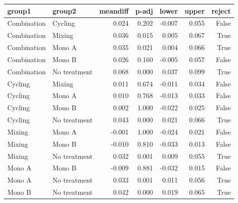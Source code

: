 \begin{tabular}{llrrrrr}
\toprule
group1 & group2 & meandiff & p-adj & lower & upper & reject \\
\midrule
Combination & Cycling & 0.024 & 0.202 & -0.007 & 0.055 & False \\
Combination & Mixing & 0.036 & 0.015 & 0.005 & 0.067 & True \\
Combination & Mono A & 0.035 & 0.021 & 0.004 & 0.066 & True \\
Combination & Mono B & 0.026 & 0.160 & -0.005 & 0.057 & False \\
Combination & No treatment & 0.068 & 0.000 & 0.037 & 0.099 & True \\
Cycling & Mixing & 0.011 & 0.674 & -0.011 & 0.034 & False \\
Cycling & Mono A & 0.010 & 0.768 & -0.013 & 0.033 & False \\
Cycling & Mono B & 0.002 & 1.000 & -0.022 & 0.025 & False \\
Cycling & No treatment & 0.043 & 0.000 & 0.021 & 0.066 & True \\
Mixing & Mono A & -0.001 & 1.000 & -0.024 & 0.021 & False \\
Mixing & Mono B & -0.010 & 0.810 & -0.033 & 0.013 & False \\
Mixing & No treatment & 0.032 & 0.001 & 0.009 & 0.055 & True \\
Mono A & Mono B & -0.009 & 0.881 & -0.032 & 0.015 & False \\
Mono A & No treatment & 0.033 & 0.001 & 0.011 & 0.056 & True \\
Mono B & No treatment & 0.042 & 0.000 & 0.019 & 0.065 & True \\
\bottomrule
\end{tabular}
